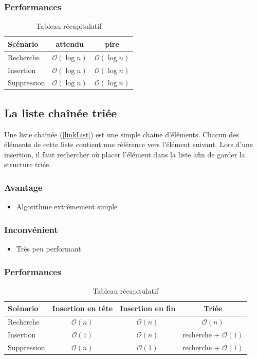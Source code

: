 \documentclass[hidelinks,a4paper, 12pt]{article}
\begin{document}
	\subsubsection*{Performances}
	\begin{table}[h]
		\begin{tabular}{|l|c|c|}
			\hline
			Scénario & attendu & pire \\
			\hline
			Recherche & $\mathcal{O}(\log n)$ & $\mathcal{O}(\log n)$ \\ 
			\hline
			Insertion & $\mathcal{O}(\log n)$ & $\mathcal{O}(\log n)$ \\
			\hline
			Suppression & $\mathcal{O}(\log n)$ & $\mathcal{O}(\log n)$\\
			\hline
		\end{tabular}
		\caption{Tableau récapitulatif}
	\end{table}
	
	\subsection{La liste chaînée triée}
	Une liste chaînée (\cref{linkList}) est une simple chaine d'éléments. Chacun des éléments de cette liste contient une référence vers l'élément suivant. Lors d'une insertion, il faut rechercher où placer l'élément dans la liste afin de garder la structure triée.
	
	
	\subsubsection*{Avantage}
	\begin{itemize}
		\item Algorithme extrêmement simple
	\end{itemize}
	\subsubsection*{Inconvénient}
	\begin{itemize}
		\item Très peu performant
	\end{itemize}
	\subsubsection*{Performances}
	\begin{table}[h]
		\begin{tabular}{|l|c|c|c|}
			\hline
			Scénario & Insertion en tête & Insertion en fin & Triée \\
			\hline
			Recherche & $\mathcal{O}(n)$ & $\mathcal{O}(n)$ & $\mathcal{O}(n)$ \\ 
			\hline
			Insertion & $\mathcal{O}(1)$ & $\mathcal{O}(n)$ & recherche +  $\mathcal{O}(1)$ \\
			\hline
			Suppression & $\mathcal{O}(n)$ & $\mathcal{O}(1)$ & recherche + $\mathcal{O}(1)$ \\
			\hline
		\end{tabular}
		\caption{Tableau récapitulatif}
	\end{table}
	
\end{document}
